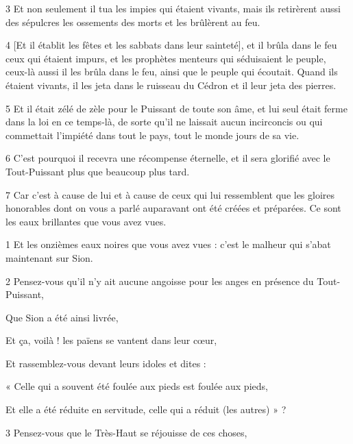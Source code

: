 \par 3 Et non seulement il tua les impies qui étaient vivants, mais ils retirèrent aussi des sépulcres les ossements des morts et les brûlèrent au feu.

\par 4 [Et il établit les fêtes et les sabbats dans leur sainteté], et il brûla dans le feu ceux qui étaient impurs, et les prophètes menteurs qui séduisaient le peuple, ceux-là aussi il les brûla dans le feu, ainsi que le peuple qui écoutait. Quand ils étaient vivants, il les jeta dans le ruisseau du Cédron et il leur jeta des pierres.

\par 5 Et il était zélé de zèle pour le Puissant de toute son âme, et lui seul était ferme dans la loi en ce temps-là, de sorte qu'il ne laissait aucun incirconcis ou qui commettait l'impiété dans tout le pays, tout le monde jours de sa vie.

\par 6 C'est pourquoi il recevra une récompense éternelle, et il sera glorifié avec le Tout-Puissant plus que beaucoup plus tard.

\par 7 Car c'est à cause de lui et à cause de ceux qui lui ressemblent que les gloires honorables dont on vous a parlé auparavant ont été créées et préparées. Ce sont les eaux brillantes que vous avez vues.


\par 1 Et les onzièmes eaux noires que vous avez vues : c'est le malheur qui s'abat maintenant sur Sion.

\par 2 Pensez-vous qu'il n'y ait aucune angoisse pour les anges en présence du Tout-Puissant,

\par Que Sion a été ainsi livrée,

\par Et ça, voilà ! les païens se vantent dans leur cœur,

\par Et rassemblez-vous devant leurs idoles et dites :

\par « Celle qui a souvent été foulée aux pieds est foulée aux pieds,

\par Et elle a été réduite en servitude, celle qui a réduit (les autres) » ?

\par 3 Pensez-vous que le Très-Haut se réjouisse de ces choses,

